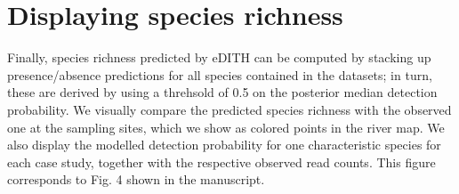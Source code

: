 \documentclass[
]{article}
\newenvironment{Shaded}{\begin{snugshade}}{\end{snugshade}}
\newcommand{\CommentTok}[1]{\textcolor[rgb]{0.56,0.35,0.01}{\textit{#1}}}
\newcommand{\ControlFlowTok}[1]{\textcolor[rgb]{0.13,0.29,0.53}{\textbf{#1}}}
\newcommand{\DecValTok}[1]{\textcolor[rgb]{0.00,0.00,0.81}{#1}}
\newcommand{\FunctionTok}[1]{\textcolor[rgb]{0.13,0.29,0.53}{\textbf{#1}}}
\newcommand{\NormalTok}[1]{#1}
\newcommand{\OtherTok}[1]{\textcolor[rgb]{0.56,0.35,0.01}{#1}}
\newcommand{\SpecialCharTok}[1]{\textcolor[rgb]{0.81,0.36,0.00}{\textbf{#1}}}
\begin{document}
\begin{Shaded}
\end{Shaded}

\hypertarget{displaying-species-richness}{%
\section{Displaying species richness}\label{displaying-species-richness}}

Finally, species richness predicted by eDITH can be computed by stacking up presence/absence predictions for all species contained in the datasets; in turn, these are derived by using a threhsold of 0.5 on the posterior median detection probability. We visually compare the predicted species richness with the observed one at the sampling sites, which we show as colored points in the river map. We also display the modelled detection probability for one characteristic species for each case study, together with the respective observed read counts. This figure corresponds to Fig. 4 shown in the manuscript.
\end{document}
